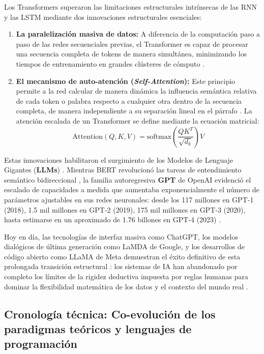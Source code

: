 \documentclass[12pt, a4paper]{article}
\begin{document}
Los Transformers superaron las limitaciones estructurales intrínsecas de las RNN y las LSTM mediante dos innovaciones estructurales esenciales:
\begin{enumerate}
    \item \textbf{La paralelización masiva de datos:} A diferencia de la computación paso a paso de las redes secuenciales previas, el Transformer es capaz de procesar una secuencia completa de tokens de manera simultánea, minimizando los tiempos de entrenamiento en grandes clústeres de cómputo \parencite{zhang2023turing}.
    \item \textbf{El mecanismo de auto-atención (\textit{Self-Attention}):} Este principio permite a la red calcular de manera dinámica la influencia semántica relativa de cada token o palabra respecto a cualquier otra dentro de la secuencia completa, de manera independiente a su separación lineal en el párrafo \parencite{zhang2023turing}. La atención escalada de un Transformer se define mediante la ecuación matricial:
    \begin{equation}
    \text{Attention}(Q, K, V) = \text{softmax}\left(\frac{Q K^T}{\sqrt{d_k}}\right) V
    \end{equation}
\end{enumerate}

Estas innovaciones habilitaron el surgimiento de los Modelos de Lenguaje Gigantes (\textbf{LLMs}) \parencite{zhang2023turing}. Mientras BERT revolucionó las tareas de entendimiento semántico bidireccional \parencite{zhang2023turing}, la familia autoregresiva \textbf{GPT} de OpenAI evidenció el escalado de capacidades a medida que aumentaba exponencialmente el número de parámetros ajustables en sus redes neuronales: desde los 117 millones en GPT-1 (2018), 1.5 mil millones en GPT-2 (2019), 175 mil millones en GPT-3 (2020), hasta estimarse en un aproximado de 1.76 billones en GPT-4 (2023) \parencite{zhang2023turing}. 

Hoy en día, las tecnologías de interfaz masiva como ChatGPT, los modelos dialógicos de última generación como LaMDA de Google, y los desarrollos de código abierto como LLaMA de Meta demuestran el éxito definitivo de esta prolongada transición estructural \parencite{zhang2023turing}: los sistemas de IA han abandonado por completo los límites de la rigidez deductiva impuesta por reglas humanas para dominar la flexibilidad matemática de los datos y el contexto del mundo real \parencite{haenlein2019brief, zhang2023turing}.

\subsection{Cronología técnica: Co-evolución de los paradigmas teóricos y lenguajes de programación}
\end{document}

